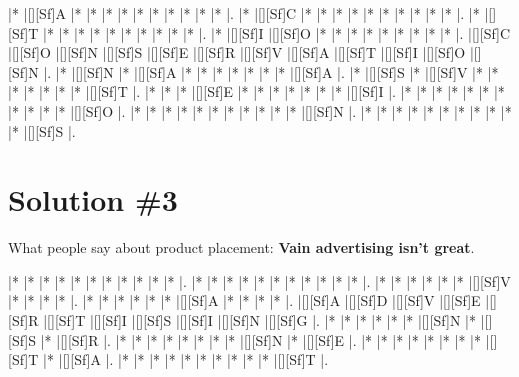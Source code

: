 \documentclass[letterpaper]{article}
\begin{document}
\vspace*{0.5cm}
\begin{Puzzle}{12}{11}
|*        |[][Sf]A  |*        |*        |*        |*        |*        |*        |*        |*        |*        |*        |. 
|*        |[][Sf]C  |*        |*        |*        |*        |*        |*        |*        |*        |*        |*        |.  
|*        |[][Sf]T  |*        |*        |*        |*        |*        |*        |*        |*        |*        |*        |.
|*        |[][Sf]I  |[][Sf]O  |*        |*        |*        |*        |*        |*        |*        |*        |*        |.  
|[][Sf]C  |[][Sf]O  |[][Sf]N  |[][Sf]S  |[][Sf]E  |[][Sf]R  |[][Sf]V  |[][Sf]A  |[][Sf]T  |[][Sf]I  |[][Sf]O  |[][Sf]N  |.
|*        |[][Sf]N  |*        |[][Sf]A  |*        |*        |*        |*        |*        |*        |*        |[][Sf]A  |. 
|*        |[][Sf]S  |*        |[][Sf]V  |*        |*        |*        |*        |*        |*        |*        |[][Sf]T  |.
|*        |*        |*        |[][Sf]E  |*        |*        |*        |*        |*        |*        |*        |[][Sf]I  |.
|*        |*        |*        |*        |*        |*        |*        |*        |*        |*        |*        |[][Sf]O  |.
|*        |*        |*        |*        |*        |*        |*        |*        |*        |*        |*        |[][Sf]N  |.
|*        |*        |*        |*        |*        |*        |*        |*        |*        |*        |*        |[][Sf]S  |.
\end{Puzzle}

\newpage

\section*{Solution \#3}
What people say about product placement: \textbf{Vain advertising isn't great}.
\vspace*{1em}
\begin{Puzzle}{11}{9}
|*        |*        |*        |*        |*        |*        |*        |*        |*        |*        |*        |. 
|*        |*        |*        |*        |*        |*        |*        |*        |*        |*        |*        |.  
|*        |*        |*        |*        |*        |*        |[][Sf]V  |*        |*        |*        |*        |.
|*        |*        |*        |*        |*        |*        |[][Sf]A  |*        |*        |*        |*        |.  
|[][Sf]A  |[][Sf]D  |[][Sf]V  |[][Sf]E  |[][Sf]R  |[][Sf]T  |[][Sf]I  |[][Sf]S  |[][Sf]I  |[][Sf]N  |[][Sf]G  |.
|*        |*        |*        |*        |*        |*        |[][Sf]N  |*        |[][Sf]S  |*        |[][Sf]R  |. 
|*        |*        |*        |*        |*        |*        |*        |*        |[][Sf]N  |*        |[][Sf]E  |.
|*        |*        |*        |*        |*        |*        |*        |*        |[][Sf]T  |*        |[][Sf]A  |.
|*        |*        |*        |*        |*        |*        |*        |*        |*        |*        |[][Sf]T  |.
\end{Puzzle}
\end{document}
